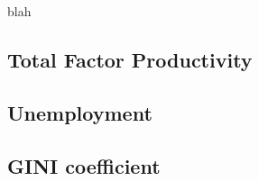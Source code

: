 \documentclass[12pt]{article}
\begin{document}
blah

\subsection{Total Factor Productivity}

\subsection{Unemployment}

\subsection{GINI coefficient}



\newpage
\singlespacing
\printbibliography


\end{document}
